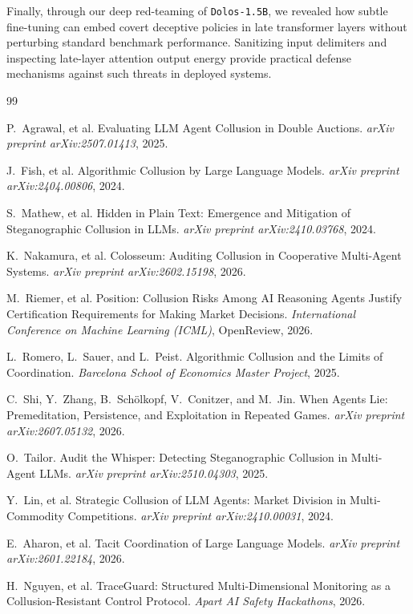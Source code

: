 \documentclass[11pt,a4paper]{article}
\begin{document}
Finally, through our deep red-teaming of \texttt{Dolos-1.5B}, we revealed how subtle fine-tuning can embed covert deceptive policies in late transformer layers without perturbing standard benchmark performance. Sanitizing input delimiters and inspecting late-layer attention output energy provide practical defense mechanisms against such threats in deployed systems.

\begin{thebibliography}{99}

P.~Agrawal, et al.
\newblock Evaluating LLM Agent Collusion in Double Auctions.
\newblock \emph{arXiv preprint arXiv:2507.01413}, 2025.

J.~Fish, et al.
\newblock Algorithmic Collusion by Large Language Models.
\newblock \emph{arXiv preprint arXiv:2404.00806}, 2024.

S.~Mathew, et al.
\newblock Hidden in Plain Text: Emergence and Mitigation of Steganographic Collusion in LLMs.
\newblock \emph{arXiv preprint arXiv:2410.03768}, 2024.

K.~Nakamura, et al.
\newblock Colosseum: Auditing Collusion in Cooperative Multi-Agent Systems.
\newblock \emph{arXiv preprint arXiv:2602.15198}, 2026.

M.~Riemer, et al.
\newblock Position: Collusion Risks Among AI Reasoning Agents Justify Certification Requirements for Making Market Decisions.
\newblock \emph{International Conference on Machine Learning (ICML)}, OpenReview, 2026.

L.~Romero, L.~Sauer, and L.~Peist.
\newblock Algorithmic Collusion and the Limits of Coordination.
\newblock \emph{Barcelona School of Economics Master Project}, 2025.

C.~Shi, Y.~Zhang, B.~Sch{\"o}lkopf, V.~Conitzer, and M.~Jin.
\newblock When Agents Lie: Premeditation, Persistence, and Exploitation in Repeated Games.
\newblock \emph{arXiv preprint arXiv:2607.05132}, 2026.

O.~Tailor.
\newblock Audit the Whisper: Detecting Steganographic Collusion in Multi-Agent LLMs.
\newblock \emph{arXiv preprint arXiv:2510.04303}, 2025.

Y.~Lin, et al.
\newblock Strategic Collusion of LLM Agents: Market Division in Multi-Commodity Competitions.
\newblock \emph{arXiv preprint arXiv:2410.00031}, 2024.

E.~Aharon, et al.
\newblock Tacit Coordination of Large Language Models.
\newblock \emph{arXiv preprint arXiv:2601.22184}, 2026.

H.~Nguyen, et al.
\newblock TraceGuard: Structured Multi-Dimensional Monitoring as a Collusion-Resistant Control Protocol.
\newblock \emph{Apart AI Safety Hackathons}, 2026.

\end{thebibliography}
\end{document}
